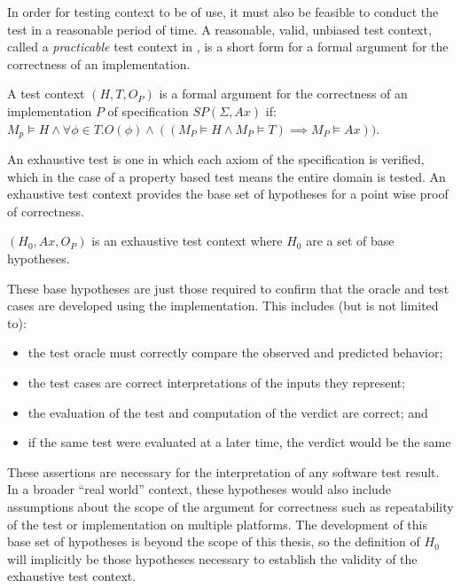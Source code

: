 In order for testing context to be of use, 
it must also be feasible to conduct the test in a reasonable period of time.
A reasonable, valid, unbiased test context,
called a \emph{practicable} test context in \cite{BernotGaudelMarre1991},
is a short form for a formal argument for the correctness of an implementation.

\begin{df}
A test context $(H, T, O_P)$ is a formal argument for 
the correctness of an implementation $P$ of specification $SP(\Sigma, Ax)$ if:
$M_{p} \models H \land \forall \phi \in T . O(\phi) \land 
((M_P \models H \land M_P \models T) \implies M_P \models Ax)) $.
\end{df}

An exhaustive test is one in which each axiom of the specification is verified,
which in the case of a property based test means the entire domain is tested.
An exhaustive test context provides the base set of hypotheses
for a point wise proof of correctness.

\begin{df}
$(H_{0}, Ax, O_P)$ is an exhaustive test context where
$H_{0}$ are a set of base hypotheses.
\end{df}

These base hypotheses are just those required to 
confirm that the oracle and test cases are developed using the implementation.
This includes (but is not limited to):

\begin{itemize}
\item the test oracle must correctly compare the observed and predicted behavior;
\item the test cases are correct interpretations of the inputs they represent;
\item the evaluation of the test and computation of the verdict are correct; and
\item if the same test were evaluated at a later time, the verdict would be the same
\end{itemize}
\noindent
These assertions are necessary for the interpretation of
any software test result.
In a broader ``real world'' context,
these hypotheses would also include assumptions
about the scope of the argument for correctness
such as repeatability of the test or implementation on multiple platforms.
The development of this base set of hypotheses is beyond the scope of this thesis,
so the definition of $H_0$ will implicitly be those hypotheses necessary 
to establish the validity of the exhaustive test context.

